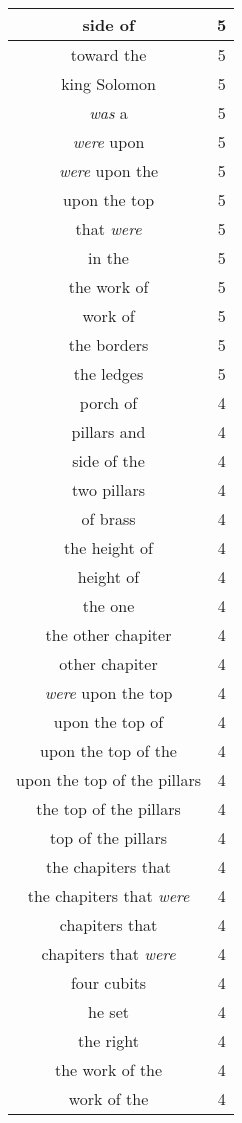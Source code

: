 \begin{center}
\begin{longtable}{|c|c|}
side of & 5\\ \hline 
toward the & 5\\ \hline 
king Solomon & 5\\ \hline 
\emph{was} a & 5\\ \hline 
\emph{were} upon & 5\\ \hline 
\emph{were} upon the & 5\\ \hline 
upon the top & 5\\ \hline 
that \emph{were} & 5\\ \hline 
in the & 5\\ \hline 
the work of & 5\\ \hline 
work of & 5\\ \hline 
the borders & 5\\ \hline 
the ledges & 5\\ \hline 
porch of & 4\\ \hline 
pillars and & 4\\ \hline 
side of the & 4\\ \hline 
two pillars & 4\\ \hline 
of brass & 4\\ \hline 
the height of & 4\\ \hline 
height of & 4\\ \hline 
the one & 4\\ \hline 
the other chapiter & 4\\ \hline 
other chapiter & 4\\ \hline 
\emph{were} upon the top & 4\\ \hline 
upon the top of & 4\\ \hline 
upon the top of the & 4\\ \hline 
upon the top of the pillars & 4\\ \hline 
the top of the pillars & 4\\ \hline 
top of the pillars & 4\\ \hline 
the chapiters that & 4\\ \hline 
the chapiters that \emph{were} & 4\\ \hline 
chapiters that & 4\\ \hline 
chapiters that \emph{were} & 4\\ \hline 
four cubits & 4\\ \hline 
he set & 4\\ \hline 
the right & 4\\ \hline 
the work of the & 4\\ \hline 
work of the & 4\\ \hline 

\end{longtable}
\end{center}
